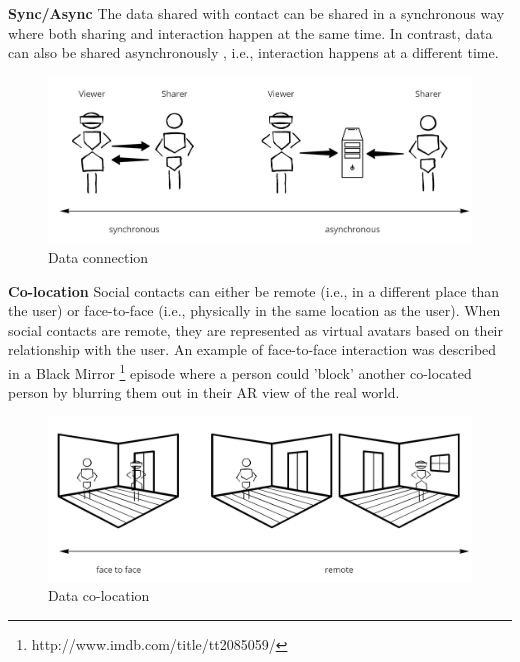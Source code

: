
\textbf{Sync/Async}
The data shared with contact can be shared in a synchronous way where both sharing and interaction happen at the same time. In contrast, data can also be shared asynchronously \cite{Smith2016}, i.e., interaction happens at a different time. 

\begin{figure}[h]
    \centering
    \includegraphics[width=.8\linewidth]{images/continuum-connection.jpg}
    \caption{Data connection}
    \label{fig:continuum:data-connection}
\end{figure}

\textbf{Co-location}
Social contacts can either be remote (i.e., in a different place than the user) or face-to-face (i.e., physically in the same location as the user). When social contacts are remote, they are represented as virtual avatars based on their relationship with the user. An example of face-to-face interaction was described in a Black Mirror \footnote{http://www.imdb.com/title/tt2085059/} episode where a person could 'block' another co-located person by blurring them out in their AR view of the real world.

\begin{figure}[h]
    \centering
    \includegraphics[width=.8\linewidth]{images/continuum-colocation.jpg}
    \caption{Data co-location}
    \label{fig:continuum:data-colocation}
\end{figure}


